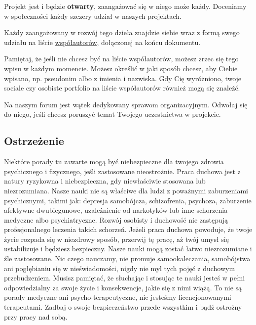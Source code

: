 \documentclass[]{coda-art}
\begin{document}
\begin{multicols}{2}
    Projekt jest i będzie \textbf{otwarty}, zaangażować się w niego może każdy.
    Doceniamy w społeczności każdy szczery udział w naszych projektach.

    Każdy zaangażowany w rozwój tego dzieła znajdzie siebie wraz z formą swego udziału na liście \hyperref[wspolautorzy]{współautorów}, dołączonej na końcu dokumentu.

    Pamiętaj, że jeśli nie chcesz być na liście współautorów, możesz zrzec się tego wpisu w każdym momencie.
    Możesz określić w jaki sposób chcesz, aby Ciebie wpisano, np. pseudonim albo z imienia i nazwiska.
    Gdy Cię wyróżniono, twoje sociale czy osobiste portfolio na liście współautorów również mogą się znaleźć.

    Na naszym forum jest wątek dedykowany sprawom organizacyjnym.
    Odwołaj się do niego, jeśli chcesz poruszyć temat Twojego uczestnictwa w projekcie.
    \vspace*{-0.8em}
\end{multicols}

\subsection*{Ostrzeżenie}
Niektóre porady tu zawarte mogą być niebezpieczne dla twojego zdrowia psychicznego i fizycznego, jeśli zastosowane nieostrożnie.
Praca duchowa jest z natury ryzykowna i niebezpieczna, gdy niewłaściwie stosowana lub niezrozumiana.
Nasze nauki nie są właściwe dla ludzi z poważnymi zaburzeniami psychicznymi, takimi jak:
depresja samobójcza, schizofrenia, psychoza, zaburzenie afektywne dwubiegunowe, uzależnienie od narkotyków lub inne schorzenia medyczne albo psychiatryczne.
Rozwój osobisty i duchowość nie zastępują profesjonalnego leczenia takich schorzeń.
Jeżeli praca duchowa powoduje, że twoje życie rozpada się w niezdrowy sposób, przerwij tę pracę, aż twój umysł się ustabilizuje i będziesz bezpieczny.
Nasze nauki mogą zostać łatwo niezrozumiane i źle zastosowane.
Nic czego nauczamy, nie promuje samookaleczania, samobójstwa ani pogłębianiu się w nieświadomości, nigdy nie myl tych pojęć z duchowym przebudzeniem.
Musisz pamiętać, że słuchając i stosując te nauki jesteś w pełni odpowiedzialny za swoje życie i konsekwencje, jakie się z nimi wiążą.
To nie są porady medyczne ani psycho-terapeutyczne, nie jesteśmy licencjonowanymi terapeutami.
Zadbaj o swoje bezpieczeństwo przede wszystkim i bądź ostrożny przy pracy nad sobą.

\twocolumn\tableofcontents
\onecolumn
\end{document}

